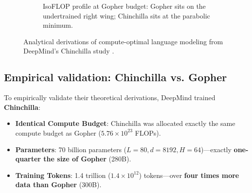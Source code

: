 \documentclass[../../main.tex]{subfiles}
\begin{document}
\begin{figure}[htbp]
\begin{subfigure}[b]{0.48\textwidth}
{%
}
\caption{IsoFLOP profile at Gopher budget: Gopher sits on the undertrained right wing; Chinchilla sits at the parabolic minimum.}
\label{fig:isoflop_curves}
\end{subfigure}
\caption{Analytical derivations of compute-optimal language modeling from DeepMind's Chinchilla study \cite{hoffmann2022}.}
\label{fig:chinchilla_analytical_visualizations}
\end{figure}

\subsection{Empirical validation: Chinchilla vs. Gopher}
\label{subsec:chinchilla_showdown}

To empirically validate their theoretical derivations, DeepMind trained \textbf{Chinchilla}:
\begin{itemize}
    \item \textbf{Identical Compute Budget}: Chinchilla was allocated exactly the same compute budget as Gopher ($5.76 \times 10^{23}$ FLOPs).
    \item \textbf{Parameters}: 70 billion parameters ($L = 80, d = 8192, H = 64$)---exactly \textbf{one-quarter the size of Gopher} (280B).
    \item \textbf{Training Tokens}: 1.4 trillion ($1.4 \times 10^{12}$) tokens---over \textbf{four times more data than Gopher} (300B).
\end{itemize}
\end{document}
